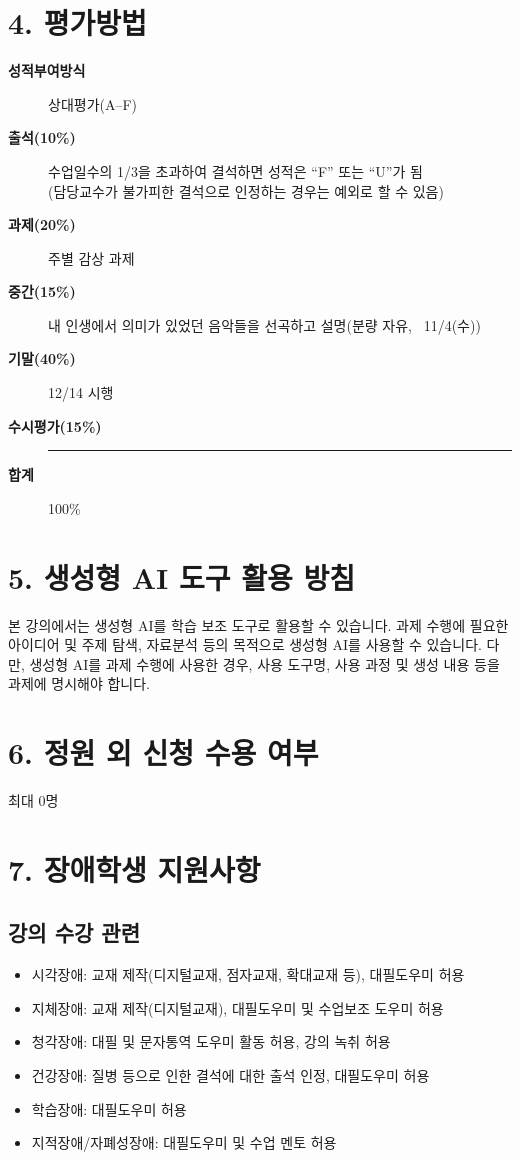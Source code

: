 \documentclass{article}
\newcommand{\descriptionrule}{%
  \item[]\vspace{-0.6em}
  \noindent\hspace*{-\leftmargin}%
  \rule{0.6\linewidth}{0.4pt}
  \vspace{-0.4em}
}
\begin{document}
\section{4. 평가방법}
\medskip
\begin{description}
    \item[\textbf{성적부여방식}] 상대평가(A--F)
    \item[\textbf{출석(10\%)}] 수업일수의 1/3을 초과하여 결석하면 성적은 ``F'' 또는 ``U''가 됨\\(담당교수가 불가피한 결석으로 인정하는 경우는 예외로 할 수 있음)
    \item[\textbf{과제(20\%)}] 주별 감상 과제
    \item[\textbf{중간(15\%)}] 내 인생에서 의미가 있었던 음악들을 선곡하고 설명(분량 자유, ~11/4(수))
    \item[\textbf{기말(40\%)}] 12/14 시행
    \item[\textbf{수시평가(15\%)}]  
    \descriptionrule
    \item[\textbf{합계}] 100\%
\end{description}

\newpage
\section{5. 생성형 AI 도구 활용 방침}
\medskip
본 강의에서는 생성형 AI를 학습 보조 도구로 활용할 수 있습니다. 과제 수행에 필요한 아이디어 및 주제 탐색, 자료분석 등의 목적으로 생성형 AI를 사용할 수 있습니다. 다만, 생성형 AI를 과제 수행에 사용한 경우, 사용 도구명, 사용 과정 및 생성 내용 등을 과제에 명시해야 합니다.

\section{6. 정원 외 신청 수용 여부}
\medskip
최대 0명

\section{7. 장애학생 지원사항}
\medskip
\subsection{강의 수강 관련}
\medskip
\begin{itemize}
    \item 시각장애: 교재 제작(디지털교재, 점자교재, 확대교재 등), 대필도우미 허용
    \item 지체장애: 교재 제작(디지털교재), 대필도우미 및 수업보조 도우미 허용
    \item 청각장애: 대필 및 문자통역 도우미 활동 허용, 강의 녹취 허용
    \item 건강장애: 질병 등으로 인한 결석에 대한 출석 인정, 대필도우미 허용
    \item 학습장애: 대필도우미 허용
    \item 지적장애/자폐성장애: 대필도우미 및 수업 멘토 허용
\end{itemize}
\end{document}
